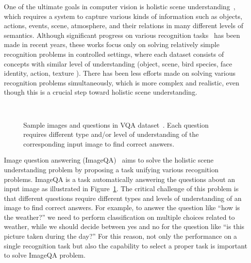 \documentclass[10pt,twocolumn,letterpaper]{article}
\begin{document}
One of the ultimate goals in computer vision is holistic scene understanding~\cite{holistic}, which requires a system to capture various kinds of information such as objects, actions, events, scene, atmosphere, and their relations in many different levels of semantics.
Although significant progress on various recognition tasks~\cite{Texture, Decaf, oquab2014learning, Vgg16, Googlenet, Deepface, Scenerecognition} has been made in recent years, these works focus only on solving relatively simple recognition problems in controlled settings, where each dataset consists of concepts with similar level of understanding (\eg object, scene, bird species, face identity, action, texture \etc).
There has been less efforts made on solving various recognition problems simultaneously, which is more complex and realistic, even though this is a crucial step toward holistic scene understanding.


\begin{figure}[t]
\centering
{}
\\ 
\caption{Sample images and questions in VQA dataset~\cite{VQA}. Each question requires different type and/or level of understanding of the corresponding input image to find correct answers.}
\label{fig:iqa_eg}
\end{figure}




Image question answering (ImageQA)~\cite{VQA, Multiworld, mren2015} aims to solve the holistic scene understanding problem by proposing a task unifying various recognition problems.
ImageQA is a task automatically answering the questions about an input image as illustrated in Figure~\ref{fig:iqa_eg}.
The critical challenge of this problem is that different questions require different types and levels of understanding of an image to find correct answers.
For example, to answer the question like ``how is the weather?'' we need to perform classification on multiple choices related to weather, while we should decide between yes and no for the question like ``is this picture taken during the day?''
For this reason, not only the performance on a single recognition task but also the capability to select a proper task is important to solve ImageQA problem.
\end{document}
